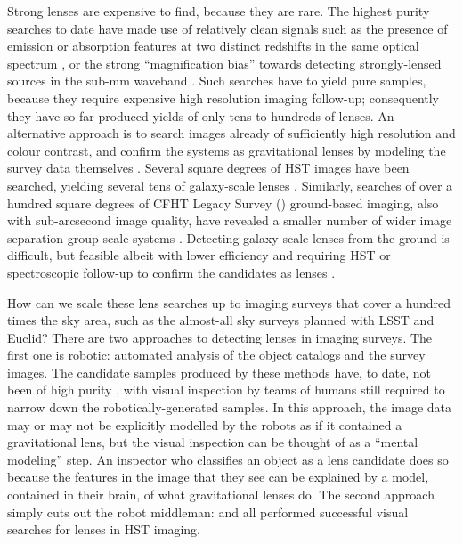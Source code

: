 \documentclass[useAMS,usenatbib,a4paper]{mn2e}
\begin{document}
Strong lenses are expensive to find, because they are rare. The highest purity
searches to date have made use of relatively clean signals such as the
presence of emission or absorption features at two distinct redshifts in the
same optical spectrum \citep[e.g.][]{BoltonEtal2004}, or the strong
``magnification bias'' towards detecting strongly-lensed sources in the sub-mm
waveband \citep[e.g.][]{NegrelloEtal2010}. Such searches have to yield pure samples,
because they require expensive high resolution imaging follow-up; consequently
they have so far produced yields of only tens to hundreds of lenses. An alternative
approach is to search images already of sufficiently high resolution and colour
contrast, and confirm the systems as gravitational lenses by modeling the
survey data themselves \citep[][]{MarshallEtal2009}. Several square degrees of
HST images have been searched, yielding several tens of galaxy-scale lenses
\citep[e.g.][]{MoustakasEtal2007,FaureEtal2008,Jackson2008,MoreEtal2011,
PawaseEtal2014}. Similarly, searches of over a hundred square degrees of CFHT
Legacy Survey (\cfhtls) ground-based imaging, also with sub-arcsecond image quality,
have revealed a smaller number of wider image separation group-scale systems
\citep[e.g.][]{CabanacEtal2007,MoreEtal2012}. Detecting galaxy-scale lenses
from the ground is difficult, but feasible albeit with lower efficiency and requiring
HST or spectroscopic follow-up to confirm the candidates as lenses
\citep[e.g.][]{GavazziEtal2014}.

How can we scale these lens searches up to imaging surveys that cover a hundred
times the sky area, such as the almost-all sky surveys planned with LSST and
Euclid?  There are two approaches to detecting lenses in imaging surveys. The
first one is robotic: automated analysis of the object catalogs and the survey
images. The candidate samples produced by these methods have, to date, not been
of high purity  \citep[see
e.g.][]{MarshallEtal2009,MoreEtal2012,GavazziEtal2014}, with visual inspection
by teams of humans still required to narrow down the robotically-generated
samples. In this approach, the image data may or may not be explicitly modelled
by the robots as if it contained a gravitational lens, but the visual inspection
can be thought of as a ``mental modeling'' step.  An inspector who classifies an
object as a lens candidate does so because the features in the image that they
see can be explained by a model, contained in their brain, of what gravitational
lenses do.  The second approach simply cuts out the robot middleman:
\citet{MoustakasEtal2007,FaureEtal2008,Jackson2008} and \citet{PawaseEtal2014}
all performed successful visual searches for lenses in HST imaging.
\end{document}
